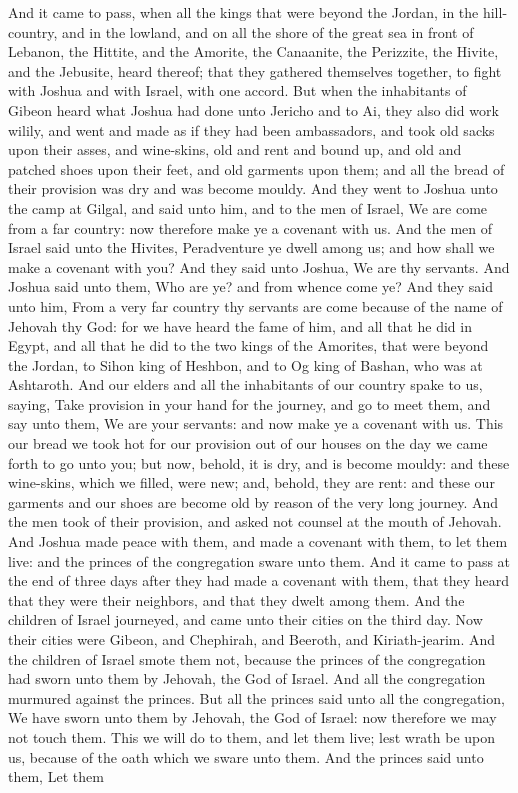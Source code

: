 And it came to pass, when all the kings that were beyond the Jordan, in the hill-country, and in the lowland, and on all the shore of the great sea in front of Lebanon, the Hittite, and the Amorite, the Canaanite, the Perizzite, the Hivite, and the Jebusite, heard thereof; that they gathered themselves together, to fight with Joshua and with Israel, with one accord.  But when the inhabitants of Gibeon heard what Joshua had done unto Jericho and to Ai, they also did work wilily, and went and made as if they had been ambassadors, and took old sacks upon their asses, and wine-skins, old and rent and bound up, and old and patched shoes upon their feet, and old garments upon them; and all the bread of their provision was dry and was become mouldy. And they went to Joshua unto the camp at Gilgal, and said unto him, and to the men of Israel, We are come from a far country: now therefore make ye a covenant with us. And the men of Israel said unto the Hivites, Peradventure ye dwell among us; and how shall we make a covenant with you? And they said unto Joshua, We are thy servants. And Joshua said unto them, Who are ye? and from whence come ye? And they said unto him, From a very far country thy servants are come because of the name of Jehovah thy God: for we have heard the fame of him, and all that he did in Egypt, and all that he did to the two kings of the Amorites, that were beyond the Jordan, to Sihon king of Heshbon, and to Og king of Bashan, who was at Ashtaroth. And our elders and all the inhabitants of our country spake to us, saying, Take provision in your hand for the journey, and go to meet them, and say unto them, We are your servants: and now make ye a covenant with us. This our bread we took hot for our provision out of our houses on the day we came forth to go unto you; but now, behold, it is dry, and is become mouldy: and these wine-skins, which we filled, were new; and, behold, they are rent: and these our garments and our shoes are become old by reason of the very long journey. And the men took of their provision, and asked not counsel at the mouth of Jehovah. And Joshua made peace with them, and made a covenant with them, to let them live: and the princes of the congregation sware unto them.  And it came to pass at the end of three days after they had made a covenant with them, that they heard that they were their neighbors, and that they dwelt among them. And the children of Israel journeyed, and came unto their cities on the third day. Now their cities were Gibeon, and Chephirah, and Beeroth, and Kiriath-jearim. And the children of Israel smote them not, because the princes of the congregation had sworn unto them by Jehovah, the God of Israel. And all the congregation murmured against the princes. But all the princes said unto all the congregation, We have sworn unto them by Jehovah, the God of Israel: now therefore we may not touch them. This we will do to them, and let them live; lest wrath be upon us, because of the oath which we sware unto them. And the princes said unto them, Let them 